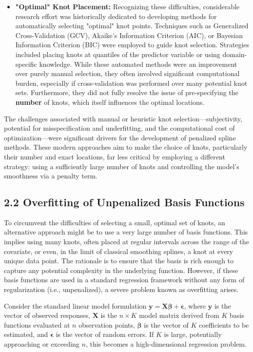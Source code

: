 \documentclass[11pt, a4paper]{article}
\begin{document}
\begin{itemize}
 \item \textbf{"Optimal" Knot Placement:} Recognizing these difficulties, considerable research effort was historically dedicated to developing methods for automatically selecting "optimal" knot points. Techniques such as Generalized Cross-Validation (GCV), Akaike's Information Criterion (AIC), or Bayesian Information Criterion (BIC) were employed to guide knot selection. Strategies included placing knots at quantiles of the predictor variable or using domain-specific knowledge. While these automated methods were an improvement over purely manual selection, they often involved significant computational burden, especially if cross-validation was performed over many potential knot sets. Furthermore, they did not fully resolve the issue of pre-specifying the \textbf{number} of knots, which itself influences the optimal locations. 
\end{itemize}
The challenges associated with manual or heuristic knot selection—subjectivity, potential for misspecification and underfitting, and the computational cost of optimization—were significant drivers for the development of penalized spline methods. These modern approaches aim to make the choice of knots, particularly their number and exact locations, far less critical by employing a different strategy: using a sufficiently large number of knots and controlling the model's smoothness via a penalty term.

\subsection{2.2  Overfitting  of  Unpenalized Basis Functions}
To circumvent the difficulties of selecting a small, optimal set of knots, an alternative approach might be to use a very large number of basis functions. This implies using many knots, often placed at regular intervals across the range of the covariate, or even, in the limit of classical smoothing splines, a knot at every unique data point. The rationale is to ensure that the basis is rich enough to capture any potential complexity in the underlying function. However, if these basis functions are used in a standard regression framework without any form of regularization (i.e., unpenalized), a severe problem known as overfitting arises.

Consider the standard linear model formulation $\mathbf{y} = \mathbf{X}\boldsymbol{\beta} + \boldsymbol{\epsilon}$, where $\mathbf{y}$ is the vector of observed responses, $\mathbf{X}$ is the $n \times K$ model matrix derived from $K$ basis functions evaluated at $n$ observation points, $\boldsymbol{\beta}$ is the vector of $K$ coefficients to be estimated, and $\boldsymbol{\epsilon}$ is the vector of random errors. If $K$ is large, potentially approaching or exceeding $n$, this becomes a high-dimensional regression problem.
\end{document}
